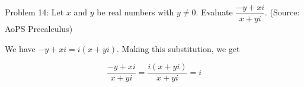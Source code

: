 Problem 14: Let $x$ and $y$ be real numbers with $y \neq 0$. Evaluate $\dfrac{-y + xi}{x + yi}$. (Source: AoPS Precalculus)

We have $-y + xi = i(x + yi)$. Making this substitution, we get

$$ \frac{-y + xi}{x + yi} = \frac{i(x + yi)}{x + yi} = \boxed{i}$$
